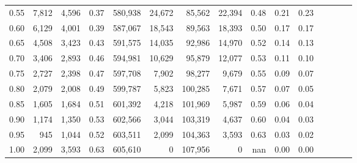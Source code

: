 \begin{tabular}{rrrcrrrrrrrrrrr}
0.55 &    7,812 &   4,596 &                                       0.37 &  580,938 &   24,672 &   85,562 &   22,394 &  0.48 &  0.21 &                         0.23 \\
0.60 &    6,129 &   4,001 &                                       0.39 &  587,067 &   18,543 &   89,563 &   18,393 &  0.50 &  0.17 &                         0.17 \\
0.65 &    4,508 &   3,423 &                                       0.43 &  591,575 &   14,035 &   92,986 &   14,970 &  0.52 &  0.14 &                         0.13 \\
0.70 &    3,406 &   2,893 &                                       0.46 &  594,981 &   10,629 &   95,879 &   12,077 &  0.53 &  0.11 &                         0.10 \\
0.75 &    2,727 &   2,398 &                                       0.47 &  597,708 &    7,902 &   98,277 &    9,679 &  0.55 &  0.09 &                         0.07 \\
0.80 &    2,079 &   2,008 &                                       0.49 &  599,787 &    5,823 &  100,285 &    7,671 &  0.57 &  0.07 &                         0.05 \\
0.85 &    1,605 &   1,684 &                                       0.51 &  601,392 &    4,218 &  101,969 &    5,987 &  0.59 &  0.06 &                         0.04 \\
0.90 &    1,174 &   1,350 &                                       0.53 &  602,566 &    3,044 &  103,319 &    4,637 &  0.60 &  0.04 &                         0.03 \\
0.95 &      945 &   1,044 &                                       0.52 &  603,511 &    2,099 &  104,363 &    3,593 &  0.63 &  0.03 &                         0.02 \\
1.00 &    2,099 &   3,593 &                                       0.63 &  605,610 &        0 &  107,956 &        0 &   nan &  0.00 &                         0.00 \\
\bottomrule
\end{tabular}
